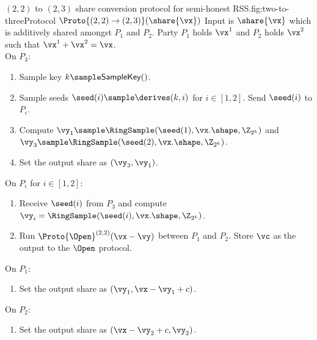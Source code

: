 
\begin{Boxfig}{$(2,2)$ to $(2,3)$ share conversion protocol for semi-honest
RSS.}{fig:two-to-three}{Protocol $\Proto{(2,2) \rightarrow (2,3)}(\share{\vx})$}
Input is $\share{\vx}$ which is additively shared amongst $P_1$ and $P_2$.
Party $P_1$ holds $\vx^1$ and $P_2$ holds $\vx^2$ such that $\vx^1 + \vx^2 = \vx$. \\
On $P_3$:
\begin{enumerate}
  \item Sample key $k \sample \mathsf{SampleKey}()$.
  \item Sample seeds $\seed(i) \sample \derives(k, i)$ for $i \in [1, 2]$. Send $\seed(i)$ to $P_i$.
  \item Compute $\vy_1 \sample \RingSample(\seed(1), \vx.\shape, \Z_{2^k})$
  and $\vy_3 \sample \RingSample(\seed(2), \vx.\shape, \Z_{2^k})$.
  \item Set
  the output share as $(\vy_3, \vy_1)$.
\end{enumerate}

On $P_i$ for $i \in [1,2]$:
\begin{enumerate}
   \item Receive $\seed(i)$ from $P_3$ and compute $\vy_i = \RingSample(\seed(i), \vx.\shape, \Z_{2^k})$.
   \item Run $\Proto{\Open}^{(2,2)}(\vx - \vy)$ between $P_1$ and $P_2$. Store $\vc$ as the output
   to the $\Open$ protocol.
\end{enumerate}

On $P_1$:
\begin{enumerate}
  \item Set the output share as $(\vy_1, \vx - \vy_1 + c)$.
\end{enumerate}
On $P_2$:
\begin{enumerate}
  \item Set the output share as $(\vx - \vy_2 + c, \vy_2)$.
\end{enumerate}
\end{Boxfig}

